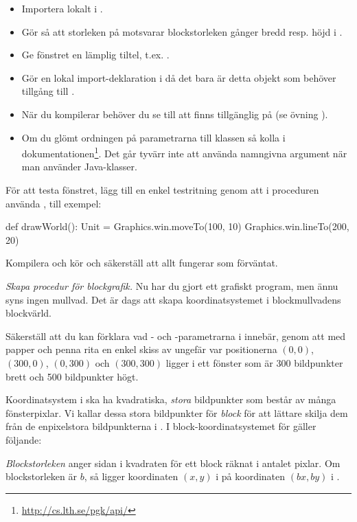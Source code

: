 \begin{itemize}%
  \item Importera  lokalt i .
  \item Gör så att storleken på  motsvarar blockstorleken gånger bredd resp. höjd i .
  \item Ge fönstret en lämplig tiltel, t.ex. .
  \item Gör en lokal import-deklaration i  då det bara är detta objekt som behöver tillgång till .
  \item När du kompilerar behöver du se till att  finns tillgänglig på  (se övning \texttt{\ExeWeekFOUR}).
  \item Om du glömt ordningen på parametrarna till klassen  så kolla i dokumentationen\footnote{\url{http://cs.lth.se/pgk/api/}}. Det går tyvärr inte att använda namngivna argument när man använder Java-klasser.
\end{itemize}

För att testa fönstret, lägg till en enkel testritning genom att i proceduren  använda , till exempel:
\begin{Code}
  def drawWorld(): Unit = {
    Graphics.win.moveTo(100, 10)
    Graphics.win.lineTo(200, 20)
  }
\end{Code}
Kompilera och kör och säkerställ att allt fungerar som förväntat.


\Task \emph{Skapa procedur för blockgrafik.} Nu har du gjort ett grafiskt program, men ännu syns ingen mullvad.
Det är dags att skapa koordinatsystemet i blockmullvadens blockvärld.

\Subtask\Pen
Säkerställ att du kan förklara vad - och -parametrarna i  innebär, genom att med papper och penna rita en enkel skiss av ungefär var positionerna $(0,0)$, $(300, 0)$, $(0, 300)$ och $(300, 300)$ ligger i ett fönster som är 300 bildpunkter brett och 500 bildpunkter högt.

\Subtask
Koordinatsystem i  ska ha kvadratiska, \emph{stora} bildpunkter som består av många fönsterpixlar. Vi kallar dessa stora bildpunkter för \emph{block} för att lättare skilja dem från de enpixelstora bildpunkterna i . I block-koordinatsystemet för  gäller följande:

\begin{framed}
\noindent \emph{Blockstorleken} anger sidan i kvadraten för ett block räknat i antalet pixlar. Om blockstorleken är $b$, så ligger koordinaten $(x, y)$ i  på koordinaten $(bx, by)$ i .

\end{framed}

